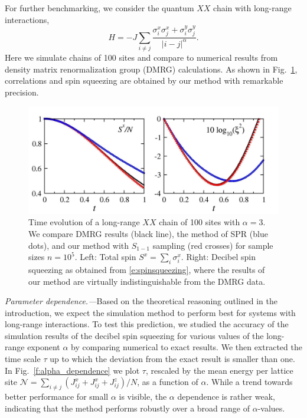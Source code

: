 \documentclass[aps,prl,showpacs,amsmath,amssymb,superscriptaddress,reprint,10pt]{revtex4-1}
\begin{document}
\begin{bibunit}
For further benchmarking, we consider the quantum $XX$ chain with long-range interactions,
\begin{equation}\label{e:XY}
H=-J\sum_{i\neq j}\frac{\sigma_i^x\sigma_j^x+\sigma_i^y\sigma_j^y}{|i-j|^\alpha}.
\end{equation}
Here we simulate chains of 100 sites and compare to numerical results from density matrix renormalization group (DMRG) calculations. As shown in Fig.~\ref{f:XX}, correlations and spin squeezing are obtained by our method with remarkable precision.

\begin{figure}\centering
\includegraphics[width=\linewidth]{./Jx05Jy05_Schach_N100_alph3_nt100000.jpg}
\caption{\label{f:XX}%
Time evolution of a long-range $XX$ chain of 100 sites with $\alpha=3$. We compare DMRG results (black line), the method of SPR (blue dots), and our method with $S_{1-1}$ sampling \cite{Note1} (red crosses) for sample sizes $n=10^5$. Left: Total spin $S^x=\sum_i\sigma_i^x$. Right: Decibel spin squeezing as obtained from \eqref{e:spinsqueezing}, where the results of our method are virtually indistinguishable from the DMRG data.
}%
\end{figure}


{\em Parameter dependence.---}Based on the theoretical reasoning outlined in the introduction, we expect the simulation method to perform best for systems with long-range interactions. To test this prediction, we studied the accuracy of the simulation results of the decibel spin squeezing for various values of the long-range exponent $\alpha$ by comparing numerical to exact results. We then extracted the time scale $\tau$ up to which the deviation from the exact result is smaller than one. In Fig.~\ref{f:alpha_dependence} we plot $\tau$, rescaled by the mean energy per lattice site $\mathscr{N}=\sum_{i\neq j} (J_{ij}^x+J_{ij}^x+J_{ij}^z)/N$, as a function of $\alpha$. While a trend towards better performance for small $\alpha$ is visible, the $\alpha$ dependence is rather weak, indicating that the method performs robustly over a broad range of $\alpha$-values. 


\end{bibunit}
\end{document}
